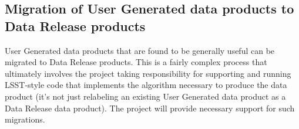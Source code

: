 %
%
%
%
%
%

\subsection{Migration of User Generated data products to Data Release products}
User Generated data products that are found to be generally useful can be migrated to Data Release products.
This is a fairly complex process that ultimately involves the project taking responsibility for supporting and running LSST-style code that implements the algorithm necessary to produce the data product (it's not just relabeling an existing User Generated data product as a Data Release data product).  The project will provide necessary support for such migrations.


